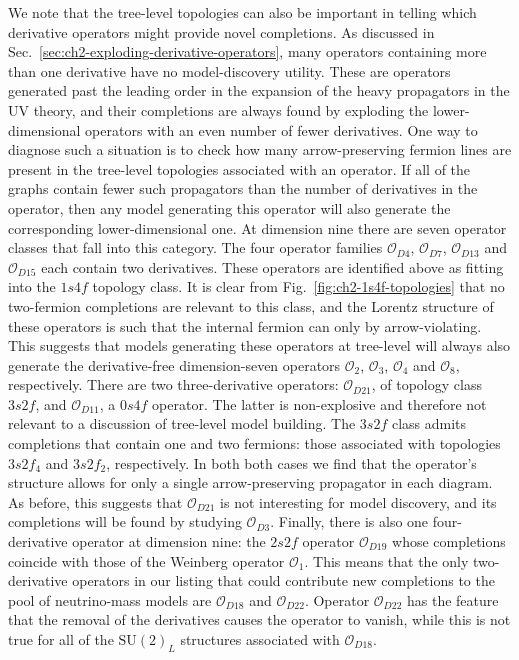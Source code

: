 We note that the tree-level topologies can also be important in telling which
derivative operators might provide novel completions. As discussed in
Sec.~\ref{sec:ch2-exploding-derivative-operators}, many operators containing more
than one derivative have no model-discovery utility. These are operators
generated past the leading order in the expansion of the heavy propagators in
the UV theory, and their completions are always found by exploding the
lower-dimensional operators with an even number of fewer derivatives. One way to
diagnose such a situation is to check how many arrow-preserving fermion lines
are present in the tree-level topologies associated with an operator. If all of
the graphs contain fewer such propagators than the number of derivatives in the
operator, then any model generating this operator will also generate the
corresponding lower-dimensional one. At dimension nine there are seven operator
classes that fall into this category. The four operator families
$\mathcal{O}_{D4}$, $\mathcal{O}_{D7}$, $\mathcal{O}_{D13}$ and
$\mathcal{O}_{D15}$ each contain two derivatives. These operators are identified
above as fitting into the $1s4f$ topology class. It is clear from
Fig.~\ref{fig:ch2-1s4f-topologies} that no two-fermion completions are relevant to
this class, and the Lorentz structure of these operators is such that the
internal fermion can only by arrow-violating. This suggests that models
generating these operators at tree-level will always also generate the
derivative-free dimension-seven operators $\mathcal{O}_{2}$, $\mathcal{O}_{3}$,
$\mathcal{O}_{4}$ and $\mathcal{O}_{8}$, respectively. There are two
three-derivative operators: $\mathcal{O}_{D21}$, of topology class $3s2f$, and
$\mathcal{O}_{D11}$, a $0s4f$ operator. The latter is non-explosive and
therefore not relevant to a discussion of tree-level model building. The $3s2f$
class admits completions that contain one and two fermions: those associated
with topologies $3s2f_{4}$ and $3s2f_{2}$, respectively. In both both cases we
find that the operator's structure allows for only a single arrow-preserving
propagator in each diagram. As before, this suggests that $\mathcal{O}_{D21}$ is
not interesting for model discovery, and its completions will be found by
studying $\mathcal{O}_{D3}$. Finally, there is also one four-derivative operator
at dimension nine: the $2s2f$ operator $\mathcal{O}_{D19}$ whose completions
coincide with those of the Weinberg operator $\mathcal{O}_{1}$. This means that
the only two-derivative operators in our listing that could contribute new
completions to the pool of neutrino-mass models are $\mathcal{O}_{D18}$ and
$\mathcal{O}_{D22}$. Operator $\mathcal{O}_{D22}$ has the feature that the
removal of the derivatives causes the operator to vanish, while this is not true
for all of the $\mathrm{SU}(2)_{L}$ structures associated with
$\mathcal{O}_{D18}$.

